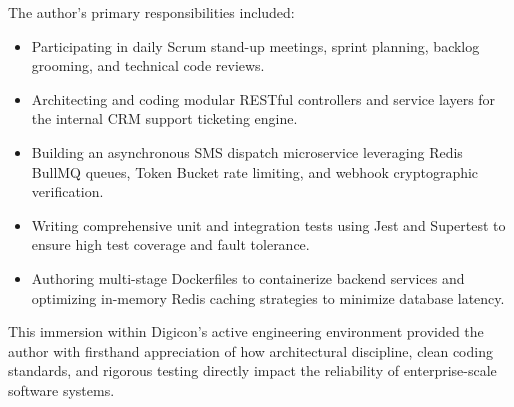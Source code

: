 The author's primary responsibilities included:
\begin{itemize}
    \item Participating in daily Scrum stand-up meetings, sprint planning, backlog grooming, and technical code reviews.
    \item Architecting and coding modular RESTful controllers and service layers for the internal CRM support ticketing engine.
    \item Building an asynchronous SMS dispatch microservice leveraging Redis BullMQ queues, Token Bucket rate limiting, and webhook cryptographic verification.
    \item Writing comprehensive unit and integration tests using Jest and Supertest to ensure high test coverage and fault tolerance.
    \item Authoring multi-stage Dockerfiles to containerize backend services and optimizing in-memory Redis caching strategies to minimize database latency.
\end{itemize}

This immersion within Digicon's active engineering environment provided the author with firsthand appreciation of how architectural discipline, clean coding standards, and rigorous testing directly impact the reliability of enterprise-scale software systems.
